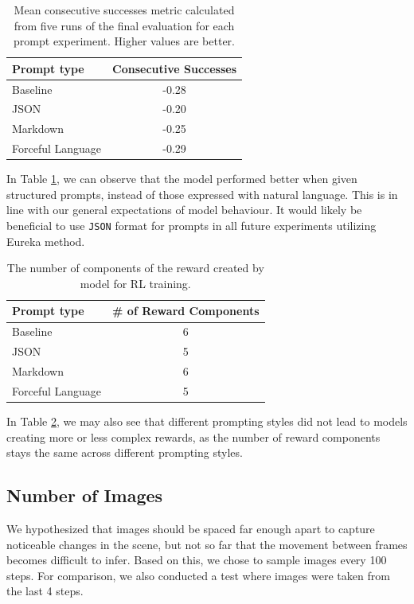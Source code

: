 \documentclass[10pt,twocolumn]{article}
\begin{document}
\begin{table}
    \centering
    \begin{tabular}{|l|c|}
        \hline
        Prompt type               & Consecutive Successes \\
        \hline
        Baseline                  & -0.28   \\
        JSON                      & -0.20   \\
        Markdown                  & -0.25   \\
        Forceful Language         & -0.29   \\
        \hline
    \end{tabular}
    \caption{Mean consecutive successes metric calculated from five runs of the final evaluation for each prompt experiment. Higher values are better.}
    \label{tab:prompts_successes}
\end{table}

In Table \ref{tab:prompts_successes}, we can observe that the model performed better when given structured prompts, instead of those expressed with natural language. This is in line with our general expectations of model behaviour. It would likely be beneficial to use \verb|JSON| format for prompts in all future experiments utilizing Eureka method.

\begin{table}
    \centering
    \begin{tabular}{|l|c|}
        \hline
        Prompt type               & \# of Reward Components \\
        \hline
        Baseline                  & 6   \\
        JSON                      & 5   \\
        Markdown                  & 6   \\
        Forceful Language         & 5   \\
        \hline
    \end{tabular}
    \caption{The number of components of the reward created by model for RL training.}
    \label{tab:prompts_reward_components}
\end{table}

In Table  \ref{tab:prompts_reward_components}, we may also see that different prompting styles did not lead to models creating more or less complex rewards, as the number of reward components stays the same across different prompting styles.

\subsection{Number of Images}
We hypothesized that images should be spaced far enough apart to capture noticeable changes in the scene, but not so far that the movement between frames becomes difficult to infer. Based on this, we chose to sample images every 100 steps. For comparison, we also conducted a test where images were taken from the last 4 steps.
\end{document}
